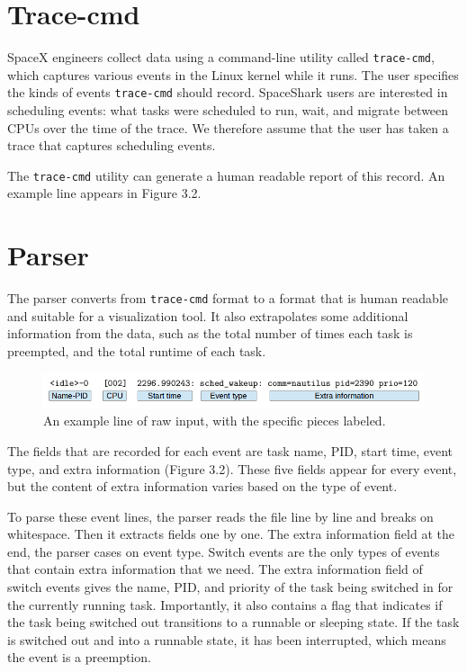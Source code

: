 \documentclass{hmcclinic}
\begin{document}
  \section{Trace-cmd}

  SpaceX engineers collect data using a command-line utility called \texttt{trace-cmd},
 which captures various events in the Linux kernel while it runs. The user specifies the kinds of events \texttt{trace-cmd} should record. SpaceShark users are interested in scheduling events: what tasks were
  scheduled to run, wait, and migrate between CPUs over the time of the trace.
  We therefore assume that the user has taken a trace that captures scheduling
  events.

  The \texttt{trace-cmd} utility can generate a human readable
  report of this record. An example line appears in Figure 3.2.
  

\normalsize
  
  \section{Parser}
  The parser converts from \texttt{trace-cmd} format to a format that is human
  readable and suitable for a visualization tool. It also extrapolates some
  additional information from the data, such as the total number of times each
  task is preempted, and the total runtime of each task.

  \begin{figure}
  \includegraphics[scale=0.4]{parserExample.png}
  \caption{ \label{fig:example_lines} An example line of raw input, with the specific pieces labeled.}
  \end{figure}

  The fields that are recorded for each event are task name, PID, start time, 
  event type, and extra information (Figure 3.2).
These five fields appear for every event, but the content of extra information
varies based on the type of event.

  To parse these event lines, the parser reads the file line by line and breaks on
  whitespace. Then it extracts fields one by one. The
  extra information field at the end, the parser cases on event type. Switch events
  are the only types of events that contain extra information that we need.  The
  extra information field of switch events gives the name, PID, and priority of
  the task being switched in for the currently running task. Importantly, it
  also contains a flag that indicates if the task being switched out transitions
  to a runnable or sleeping state. If the task is switched out and into a
  runnable state, it has been interrupted,  which means the event is a preemption.
\end{document}
